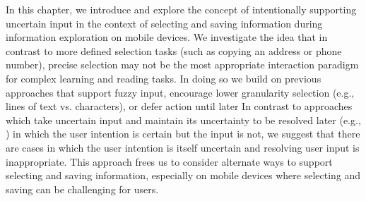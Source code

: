 



In this chapter, we introduce and explore the concept of intentionally supporting uncertain input in the context of selecting and saving information during information exploration on mobile devices. We investigate the idea that in contrast to more defined selection tasks (such as copying an address or phone number), precise selection may not be the most appropriate interaction paradigm for complex learning and reading tasks. In doing so we build on previous approaches that support fuzzy input, encourage lower granularity selection (e.g., lines of text vs. characters), or defer action until later \cite{schilit1998beyond,lank2005sloppy, tashman2011liquidtext,hinckley2012informal,kittur2013costs,schwarz2015architecture}
In contrast to approaches which take uncertain input and maintain its uncertainty to be resolved later (e.g., \cite{schwarz2015architecture}) in which the user intention is certain but the input is not, we suggest that there are cases in which the user intention is itself uncertain and resolving user input is inappropriate. This approach frees us to consider alternate ways to support selecting and saving information, especially on mobile devices where selecting and saving can be challenging for users. 

